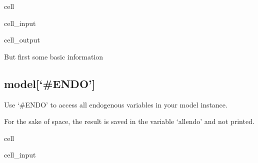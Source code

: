 \documentclass[letterpaper,10pt,english]{jupyterBook}
\begin{document}
\begin{sphinxuseclass}{cell}\begin{sphinxVerbatimInput}

\begin{sphinxuseclass}{cell_input}
\begin{sphinxVerbatim}[commandchars=\\\{\}]
 
    \PYG{p}{[}\PYG{p}{]}
\end{sphinxVerbatim}

\end{sphinxuseclass}\end{sphinxVerbatimInput}
\begin{sphinxVerbatimOutput}

\begin{sphinxuseclass}{cell_output}
\noindent{}

\end{sphinxuseclass}\end{sphinxVerbatimOutput}

\end{sphinxuseclass}
\sphinxAtStartPar
But first some basic information


\subsection{model{[}‘\#ENDO’{]}}
\label{\detokenize{content/Python/modelflow_features:model-endo}}
\sphinxAtStartPar
Use ‘\#ENDO’ to access all endogenous variables in your model instance.

\sphinxAtStartPar
For the sake of space, the result is saved in the variable ‘allendo’ and not printed.

\begin{sphinxuseclass}{cell}\begin{sphinxVerbatimInput}

\begin{sphinxuseclass}{cell_input}
\begin{sphinxVerbatim}[commandchars=\\\{\}]
  \PYG{p}{[}\PYG{p}{]}
\end{sphinxVerbatim}

\end{sphinxuseclass}\end{sphinxVerbatimInput}

\end{sphinxuseclass}
\end{document}
